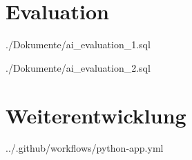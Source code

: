 \section{Evaluation}
\label{sec:anhang-evaluation}


{./Dokumente/ai_evaluation_1.sql}
\clearpage


{./Dokumente/ai_evaluation_2.sql}
\clearpage

\section{Weiterentwicklung}
\label{sec:anhang-weiterentwicklung}

\begin{minipage}{\textwidth}
	
	{../.github/workflows/python-app.yml}
\end{minipage}
\clearpage
